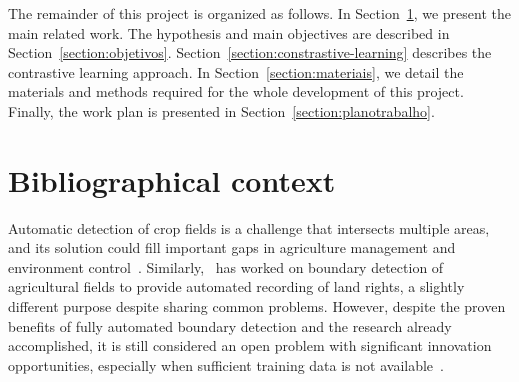 \documentclass[12pt]{article}
\begin{document}


The remainder of this project is organized as follows. In Section~\ref{section:bibliografia}, we present the main related work. The hypothesis and main objectives are described in Section~\ref{section:objetivos}. Section~\ref{section:constrastive-learning} describes the contrastive learning approach. In Section~\ref{section:materiais}, we detail the materials and methods required for the whole development of this project. Finally, the work plan is presented in Section~\ref{section:planotrabalho}.

\section{Bibliographical context}\label{section:bibliografia}

Automatic detection of crop fields is a challenge that intersects multiple areas, and its solution could fill important gaps in agriculture management and environment control~\citep{bolfe2020}. Similarly,~\citet{crommelinck2019} has worked on boundary detection of agricultural fields to provide automated recording of land rights, a slightly different purpose despite sharing common problems. However, despite the proven benefits of fully automated boundary detection and the research already accomplished, it is still considered an open problem with significant innovation opportunities, especially when sufficient training data is not available~\citep{waldner2021,yang2020}.
\end{document}
